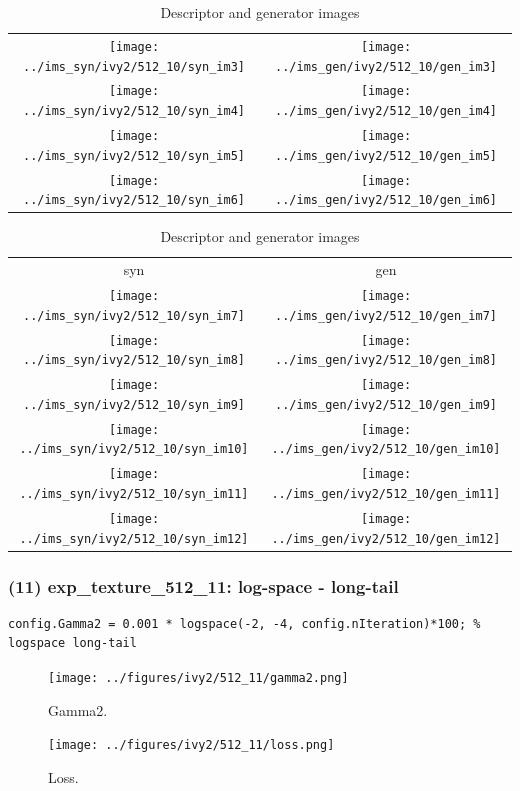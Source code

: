 \documentclass[letter]{article}
\begin{document}
\begin{table}[h!]
\begin{tabular}{cc}
		\texttt{[image: ../ims\_syn/ivy2/512\_10/syn\_im3]} & \texttt{[image: ../ims\_gen/ivy2/512\_10/gen\_im3]} \tabularnewline
		\texttt{[image: ../ims\_syn/ivy2/512\_10/syn\_im4]} & \texttt{[image: ../ims\_gen/ivy2/512\_10/gen\_im4]} \tabularnewline
		\texttt{[image: ../ims\_syn/ivy2/512\_10/syn\_im5]} & \texttt{[image: ../ims\_gen/ivy2/512\_10/gen\_im5]} \tabularnewline
		\texttt{[image: ../ims\_syn/ivy2/512\_10/syn\_im6]} & \texttt{[image: ../ims\_gen/ivy2/512\_10/gen\_im6]} \tabularnewline
	\end{tabular}
	\begin{tabular}{cc}
		syn & gen\tabularnewline
		\texttt{[image: ../ims\_syn/ivy2/512\_10/syn\_im7]} & \texttt{[image: ../ims\_gen/ivy2/512\_10/gen\_im7]} \tabularnewline
		\texttt{[image: ../ims\_syn/ivy2/512\_10/syn\_im8]} & \texttt{[image: ../ims\_gen/ivy2/512\_10/gen\_im8]} \tabularnewline
		\texttt{[image: ../ims\_syn/ivy2/512\_10/syn\_im9]} & \texttt{[image: ../ims\_gen/ivy2/512\_10/gen\_im9]} \tabularnewline
		\texttt{[image: ../ims\_syn/ivy2/512\_10/syn\_im10]} & \texttt{[image: ../ims\_gen/ivy2/512\_10/gen\_im10]} \tabularnewline
		\texttt{[image: ../ims\_syn/ivy2/512\_10/syn\_im11]} & \texttt{[image: ../ims\_gen/ivy2/512\_10/gen\_im11]} \tabularnewline
		\texttt{[image: ../ims\_syn/ivy2/512\_10/syn\_im12]} & \texttt{[image: ../ims\_gen/ivy2/512\_10/gen\_im12]} \tabularnewline
	\end{tabular}
	\caption{Descriptor and generator images}
\end{table}
\newpage

\subsubsection*{(11) exp\_texture\_512\_11: log-space - long-tail}

\begin{lstlisting}
config.Gamma2 = 0.001 * logspace(-2, -4, config.nIteration)*100; % logspace long-tail
\end{lstlisting}

\begin{figure}[h!]
	\centering
	\texttt{[image: ../figures/ivy2/512\_11/gamma2.png]}
	\caption{\label{fig:gamma1}Gamma2.}
\end{figure}

\begin{figure}[h!]
	\centering
	\texttt{[image: ../figures/ivy2/512\_11/loss.png]}
	\caption{\label{fig:gamma1}Loss.}
\end{figure}
\end{document}
